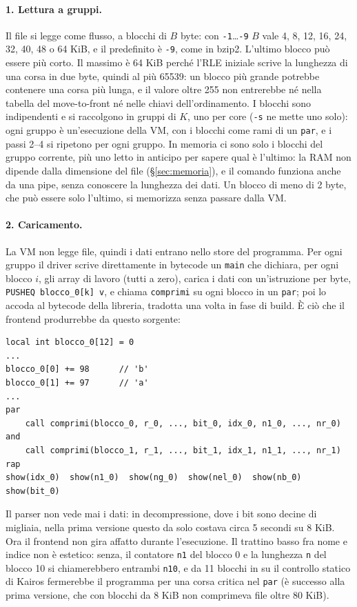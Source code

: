 \documentclass[11pt,a4paper]{article}
\newcommand{\kw}[1]{\texttt{#1}}
\begin{document}
\paragraph{1. Lettura a gruppi.} Il file si legge come flusso, a blocchi di $B$ byte: con \kw{-1}\dots\kw{-9} $B$ vale 4, 8, 12, 16, 24, 32, 40, 48 o 64 KiB, e il predefinito è \kw{-9}, come in bzip2. L'ultimo blocco può essere più corto. Il massimo è 64 KiB perché l'RLE iniziale scrive la lunghezza di una corsa in due byte, quindi al più 65539: un blocco più grande potrebbe contenere una corsa più lunga, e il valore oltre 255 non entrerebbe né nella tabella del move-to-front né nelle chiavi dell'ordinamento. I blocchi sono indipendenti e si raccolgono in gruppi di $K$, uno per core (\kw{-s} ne mette uno solo): ogni gruppo è un'esecuzione della VM, con i blocchi come rami di un \kw{par}, e i passi 2--4 si ripetono per ogni gruppo. In memoria ci sono solo i blocchi del gruppo corrente, più uno letto in anticipo per sapere qual è l'ultimo: la RAM non dipende dalla dimensione del file (§\ref{sec:memoria}), e il comando funziona anche da una pipe, senza conoscere la lunghezza dei dati. Un blocco di meno di 2 byte, che può essere solo l'ultimo, si memorizza senza passare dalla VM.

\paragraph{2. Caricamento.} La VM non legge file, quindi i dati entrano nello store del programma. Per ogni gruppo il driver scrive direttamente in bytecode un \kw{main} che dichiara, per ogni blocco $i$, gli array di lavoro (tutti a zero), carica i dati con un'istruzione per byte, \kw{PUSHEQ blocco\_0[k] v}, e chiama \kw{comprimi} su ogni blocco in un \kw{par}; poi lo accoda al bytecode della libreria, tradotta una volta in fase di build. È ciò che il frontend produrrebbe da questo sorgente:
\begin{lstlisting}
local int blocco_0[12] = 0
...
blocco_0[0] += 98      // 'b'
blocco_0[1] += 97      // 'a'
...
par
    call comprimi(blocco_0, r_0, ..., bit_0, idx_0, n1_0, ..., nr_0)
and
    call comprimi(blocco_1, r_1, ..., bit_1, idx_1, n1_1, ..., nr_1)
rap
show(idx_0)  show(n1_0)  show(ng_0)  show(nel_0)  show(nb_0)  show(bit_0)
\end{lstlisting}
Il parser non vede mai i dati: in decompressione, dove i bit sono decine di migliaia, nella prima versione questo da solo costava circa 5 secondi su 8 KiB. Ora il frontend non gira affatto durante l'esecuzione. Il trattino basso fra nome e indice non è estetico: senza, il contatore \kw{n1} del blocco 0 e la lunghezza \kw{n} del blocco 10 si chiamerebbero entrambi \kw{n10}, e da 11 blocchi in su il controllo statico di Kairos fermerebbe il programma per una corsa critica nel \kw{par} (è successo alla prima versione, che con blocchi da 8 KiB non comprimeva file oltre 80 KiB).
\end{document}

